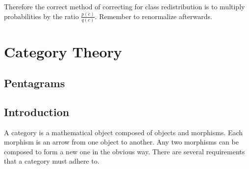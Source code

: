 \documentclass[12pt]{article}
\begin{document}
Therefore the correct method of correcting for class redistribution is to multiply probabilities by the ratio $\frac{p(c)}{q(c)}$. Remember to renormalize afterwards.

\section{Category Theory}

\subsection{Pentagrams}


\subsection{Introduction}

A category is a mathematical object composed of objects and morphisms. Each morphism is an arrow from one object to another. Any two morphisms can be composed to form a new one in the obvious way. There are several requirements that a category must adhere to.

\end{document}
